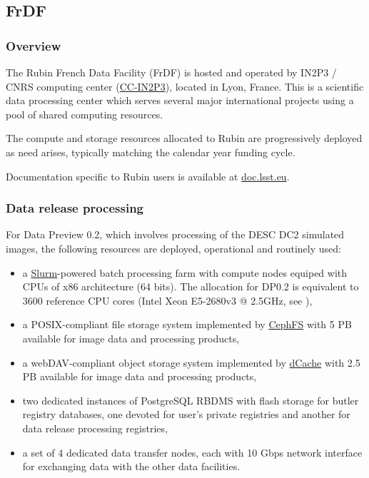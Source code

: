 \subsection{FrDF}

\subsubsection{Overview}

The Rubin French Data Facility (FrDF) is hosted and operated by IN2P3 / CNRS
computing center (\href{https://cc.in2p3.fr/en/}{CC-IN2P3}),
located in Lyon, France. This is a scientific data processing center which
serves several major international projects using a pool of shared computing
resources.

The compute and storage resources allocated to Rubin are progressively deployed
as need arises, typically matching the calendar year funding cycle.

Documentation specific to Rubin users is available at \href{https://doc.lsst.eu}{doc.lsst.eu}.

\subsubsection{Data release processing}

For Data Preview 0.2, which involves processing of the DESC DC2 simulated images,
the following resources are deployed, operational and routinely used:

\begin{itemize}
\item a \href{https://slurm.schedmd.com}{Slurm}-powered batch processing farm with
compute nodes equiped with CPUs of x86 architecture (64 bits). The allocation for
DP0.2 is equivalent to 3600 reference CPU cores (Intel Xeon E5-2680v3 @ 2.5GHz, see 
),
\item a POSIX-compliant file storage system implemented by 
\href{https://docs.ceph.com/en/latest/cephfs/index.html}{CephFS} with 5 PB 
available for image data and processing products,
\item a webDAV-compliant object storage system implemented by 
\href{https://www.dcache.org}{dCache} with 2.5 PB available for image data and
processing products,
\item two dedicated instances of PostgreSQL RBDMS with flash storage for butler
registry databases, one devoted for user's private registries and another for data release
processing registries,
\item a set of 4 dedicated data transfer nodes, each with 10 Gbps network
interface for exchanging data with the other data facilities.
\end{itemize}

